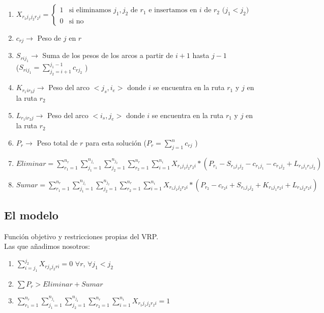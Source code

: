 \documentclass{report}
\begin{document}
\begin{enumerate}
\item
$
 X_{r_1 j_1 j_2 r_2 i}= 
\begin{cases}  
    1 & \text{si eliminamos $j_1,j_2$ de $r_1$ e insertamos en $i$ de $r_2$ ($j_1< j_2$) }\\
    0 & \text{si no } 
\end{cases}
$
\item{$c_{rj}\rightarrow$ Peso de $j$ en $r$}

\item{$S_{rij_1}\rightarrow$ Suma de los pesos de los arcos a partir de $i+1$ hasta $j-1$}\\
($S_{rij_1}=\sum\limits_{j_2=i+1}^{j_1-1} c_{rj_2}$ )

\item{$K_{r_1ir_2j}\rightarrow$ Peso del arco $<j_s,i_e>$ donde $i$ se encuentra en la ruta $r_1$ y $j$ en la ruta $r_2$}

\item{$L_{r_1ir_2j}\rightarrow$ Peso del arco $<i_s,j_e>$ donde $i$ se encuentra en la ruta $r_1$ y $j$ en la ruta $r_2$}

\item{$P_r\rightarrow$ Peso total de $r$ para esta solución ($P_r=\sum\limits_{j=1}^{n} c_{rj}$ ) }

\item{$Eliminar=\sum\limits_{r_1=1}^{n_{r}} \sum\limits_{j_1=1}^{n_{j_1}}\sum\limits_{j_2=1}^{n_{j_2}}\sum\limits_{r_2=1}^{n_{r}}\sum\limits_{i=1}^{n_i} X_{{r_1}{j_1}{j_2}{r_2}{i}}*(P_{r_1}-S_{{r_1}{j_1}{j_2}}-c_{{r_1}{j_1}}-c_{{r_1}{j_2}}+L_{{r_1}{j_1}{r_1}{j_2}})$}

\item{$Sumar=\sum\limits_{r_1=1}^{n_{r}} \sum\limits_{j_1=1}^{n_{j_1}}\sum\limits_{j_2=1}^{n_{j_2}}\sum\limits_{r_2=1}^{n_{r}}\sum\limits_{i=1}^{n_i} X_{{r_1}{j_1}{j_2}{r_2}{i}}*(P_{r_2} - c_{{r_2}{i}} + S_{{r_1}{j_1}{j_2}}+K_{{r_1}{j_1}{r_2}{i}} + L_{{r_1}{j_2}{r_2}{i}}) $}
\end{enumerate}
\subsection{El modelo}
	Función objetivo y restricciones propias del VRP.\\
Las que añadimos nosotros:
\begin{enumerate}
\item{$\sum\limits_{i=j_1}^{j_2} X_{rj_1j_2ri}=0$  $ \forall r$, $\forall j_1<j_2 $}
\item{$\sum P_r> Eliminar + Sumar $}
\item{$ \sum\limits_{r_1=1}^{n_{r}} \sum\limits_{j_1=1}^{n_{j_1}}\sum\limits_{j_2=1}^{n_{j_2}}\sum\limits_{r_2=1}^{n_{r}}\sum\limits_{i=1}^{n_i}X_{{r_1}{j_1}{j_2}{r_2}{i}} = 1 $}
\end{enumerate}

 
\end{document}
